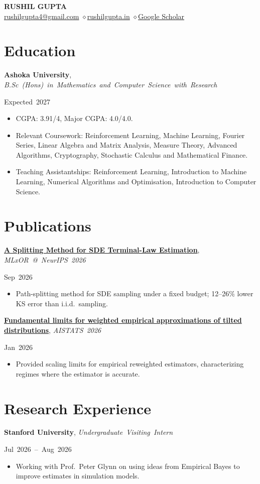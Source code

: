 \documentclass[11pt,letterpaper]{article}
\newcommand{\header}[4]{%
  \begin{center}
    {\LARGE\bfseries\MakeUppercase{#1}}\\[4pt]
    \href{mailto:#2}{#2} \enspace$\diamond$\enspace \href{https://#3}{#3} \enspace$\diamond$\enspace \href{#4}{Google Scholar}
  \end{center}\vspace{-6pt}}
\newlength{\datewidth}
\newcommand{\heading}[3]{%
  \settowidth{\datewidth}{#3}%
  \par\vspace{2pt}\parbox[t]{\dimexpr\linewidth-\datewidth-1em}{\raggedright\textbf{#1}, \mbox{\textit{#2}}}%
  \hfill\mbox{#3}\par}
\newenvironment{bullets}
  {\begin{itemize}[leftmargin=1.2em,label=\textbullet,itemsep=0pt,parsep=0pt,topsep=0pt,partopsep=0pt]}
  {\end{itemize}}
\begin{document}
\header{Rushil Gupta}{rushilgupta4@gmail.com}{rushilgupta.in}{https://scholar.google.com/citations?user=yn5rnr4AAAAJ}

\section{Education}
\heading{Ashoka University}{B.Sc (Hons) in Mathematics and Computer Science with Research}{Expected 2027}
\begin{bullets}
  \item CGPA: 3.91/4, Major CGPA: 4.0/4.0.
  \item Relevant Coursework: Reinforcement Learning, Machine Learning, Fourier Series, Linear Algebra and Matrix Analysis, Measure Theory, Advanced Algorithms, Cryptography, Stochastic Calculus and Mathematical Finance.
  \item Teaching Assistantships: Reinforcement Learning, Introduction to Machine Learning, Numerical Algorithms and Optimisation, Introduction to Computer Science.
\end{bullets}

\section{Publications}
\heading{\href{https://arxiv.org/abs/2609.12513}{A Splitting Method for SDE Terminal-Law Estimation}}{MLxOR @ NeurIPS 2026}{Sep 2026}
\begin{bullets}
  \item Path-splitting method for SDE sampling under a fixed budget; 12--26\% lower KS error than i.i.d.\ sampling.
\end{bullets}

\heading{\href{https://arxiv.org/abs/2512.23979}{Fundamental limits for weighted empirical approximations of tilted distributions}}{AISTATS 2026}{Jan 2026}
\begin{bullets}
  \item Provided scaling limits for empirical reweighted estimators, characterizing regimes where the estimator is accurate.
\end{bullets}

\section{Research Experience}
\heading{Stanford University}{Undergraduate Visiting Intern}{Jul 2026 -- Aug 2026}
\begin{bullets}
  \item Working with Prof.~Peter Glynn on using ideas from Empirical Bayes to improve estimates in simulation models.
\end{bullets}
\end{document}
